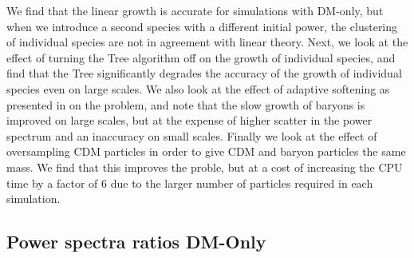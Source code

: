\documentclass[]{article}
\begin{document}
We find that the linear growth is accurate for simulations with DM-only, but when we introduce a second species with a different initial power, the clustering of individual species are not in agreement with linear theory. Next, we look at the effect of turning the Tree algorithm off on the growth of individual species, and find that the Tree significantly degrades the accuracy of the growth of individual species even on large scales. We also look at the effect of adaptive softening as presented in \cite{Adaptive} on the problem, and note that the slow growth of baryons is improved on large scales, but at the expense of higher scatter in the power spectrum and an inaccuracy on small scales. Finally we look at the effect of oversampling CDM particles in order to give CDM and baryon particles the same mass. We find that this improves the proble, but at a cost of increasing the CPU time by a factor of 6 due to the larger number of particles required in each simulation.


\clearpage

\subsection{Power spectra ratios DM-Only}
\end{document}
